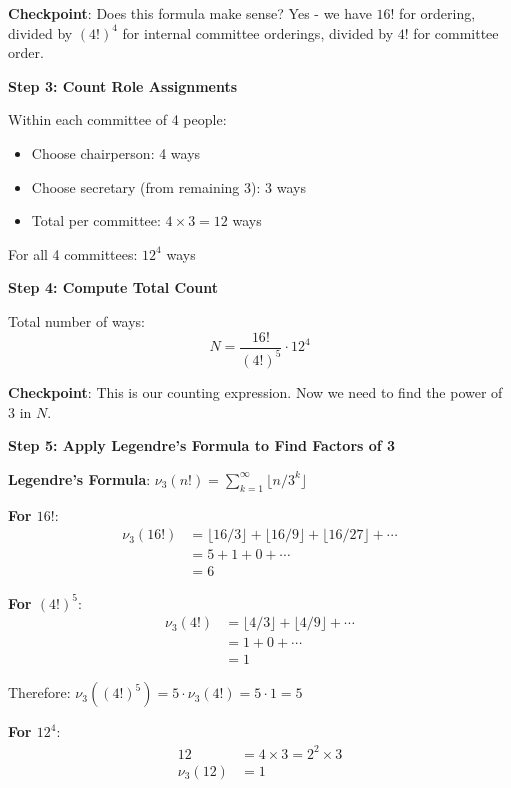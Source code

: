 \documentclass[12pt]{article}
\begin{document}
\begin{solutionbox}
\textbf{Checkpoint}: Does this formula make sense? Yes - we have $16!$ for ordering, divided by $(4!)^4$ for internal committee orderings, divided by $4!$ for committee order.

\vspace{0.3cm}

\textbf{Step 3: Count Role Assignments}

Within each committee of 4 people:
\begin{itemize}
    \item Choose chairperson: 4 ways
    \item Choose secretary (from remaining 3): 3 ways
    \item Total per committee: $4 \times 3 = 12$ ways
\end{itemize}

For all 4 committees: $12^4$ ways

\vspace{0.3cm}

\textbf{Step 4: Compute Total Count}

Total number of ways:
$$N = \frac{16!}{(4!)^5} \cdot 12^4$$

\textbf{Checkpoint}: This is our counting expression. Now we need to find the power of 3 in $N$.

\vspace{0.3cm}

\textbf{Step 5: Apply Legendre's Formula to Find Factors of 3}

\textbf{Legendre's Formula}: $\nu_3(n!) = \sum_{k=1}^{\infty} \lfloor n/3^k \rfloor$

\textbf{For $16!$}:
\begin{align*}
    \nu_3(16!) &= \lfloor 16/3 \rfloor + \lfloor 16/9 \rfloor + \lfloor 16/27 \rfloor + \cdots \\
    &= 5 + 1 + 0 + \cdots \\
    &= 6
\end{align*}

\textbf{For $(4!)^5$}:
\begin{align*}
    \nu_3(4!) &= \lfloor 4/3 \rfloor + \lfloor 4/9 \rfloor + \cdots \\
    &= 1 + 0 + \cdots \\
    &= 1
\end{align*}

Therefore: $\nu_3((4!)^5) = 5 \cdot \nu_3(4!) = 5 \cdot 1 = 5$

\textbf{For $12^4$}:
\begin{align*}
    12 &= 4 \times 3 = 2^2 \times 3 \\
    \nu_3(12) &= 1
\end{align*}


\end{solutionbox}
\end{document}
